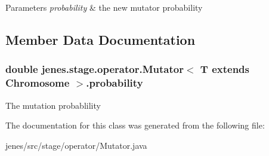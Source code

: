 \begin{DoxyParams}{Parameters}
{\em probability} & the new mutator probability \\
\hline
\end{DoxyParams}


\subsection{Member Data Documentation}
\hypertarget{classjenes_1_1stage_1_1operator_1_1_mutator_3_01_t_01extends_01_chromosome_01_4_a60f38eb7afd1ad6a7d1c0c639df2d5fe}{
\subsubsection[{probability}]{\setlength{\rightskip}{0pt plus 5cm}double jenes.\-stage.\-operator.\-Mutator$<$ T extends Chromosome $>$.probability\hspace{0.3cm}{\ttfamily [protected]}}}\label{classjenes_1_1stage_1_1operator_1_1_mutator_3_01_t_01extends_01_chromosome_01_4_a60f38eb7afd1ad6a7d1c0c639df2d5fe}
The mutation probablility 

The documentation for this class was generated from the following file\-:\begin{DoxyCompactItemize}
\item 
jenes/src/stage/operator/Mutator.\-java\end{DoxyCompactItemize}
